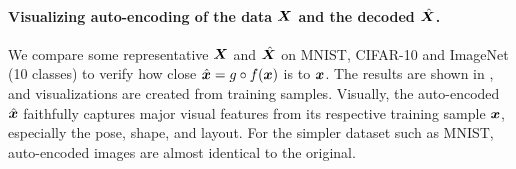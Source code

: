 \documentclass[\toplevelprefix/book-main.tex]{subfiles}
\begin{document}
\paragraph{Visualizing auto-encoding of the data $\bm{X}$ and the decoded $\hat {\bm{X}}$.} We compare some representative $\bm{X}$ and $\hat{\bm{X}}$ on MNIST, CIFAR-10 and ImageNet (10 classes) to verify how close $\hat {\bm{x}} = g\circ f(\bm{x})$ is to $\bm{x}$. The results are shown in , and visualizations are created from training samples. Visually, the auto-encoded $\hat {\bm{x}}$ faithfully captures major visual features from its respective training sample $\bm{x}$, especially the pose, shape, and layout. For the simpler dataset such as MNIST, auto-encoded images are almost identical to the original. %

\end{document}
